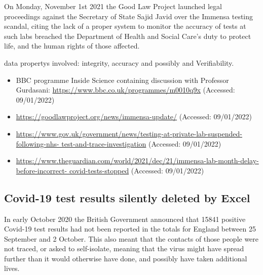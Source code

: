 On Monday, November 1st 2021 the Good Law Project launched legal proceedings against the Secretary of State Sajid Javid over the Immensa testing scandal,
citing the lack of a proper system to monitor the \gls{accuracy} of tests at such labs breached the Department of Health and Social Care's duty to protect life, and the human rights of those affected.

\Glspl{data property} involved: \gls{integrity}, \gls{accuracy} and possibly  and Verifiability.

\begin{itemize}
  \item BBC programme Inside Science containing discussion with Professor Gurdasani: \href{https://www.bbc.co.uk/programmes/m0010q9x}{https://www.bbc.co.uk/programmes/m0010q9x} (Accessed: 09/01/2022)
  \item\href{https://goodlawproject.org/news/immensa-update/}{https://goodlawproject.org/news/immensa-update/} (Accessed: 09/01/2022)
  \item\href{https://www.gov.uk/government/news/testing-at-private-lab-suspended-following-nhs-test-and-trace-investigation}{https://www.gov.uk/government/news/testing-at-private-lab-suspended-following-nhs- test-and-trace-investigation} (Accessed: 09/01/2022)
  \item\href{https://www.theguardian.com/world/2021/dec/21/immensa-lab-month-delay-before-incorrect-covid-tests-stopped}{https://www.theguardian.com/world/2021/dec/21/immensa-lab-month-delay-before-incorrect- covid-tests-stopped} (Accessed: 09/01/2022)
\end{itemize}

\subsection{Covid-19 test results silently deleted by Excel} \label{bkm:incacc:covidexcel}

In early October 2020 the British Government announced that 15841 positive Covid-19 test results had not been reported in the totals for England between 25 September and 2 October. This also meant that the contacts of those people were not traced, or asked to self-isolate, meaning that the virus might have spread further than it would otherwise have done, and possibly have taken additional lives.

